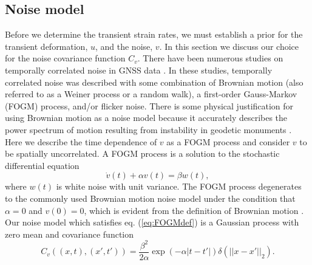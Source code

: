 \documentclass[10pt,a4paper]{article}
\begin{document}
\subsection{Noise model}\label{sec:NoiseModel}
Before we determine the transient strain rates, we must establish a prior for the transient deformation, $u$, and the noise, $v$. In this section we discuss our choice for the noise covariance function $C_v$. There have been numerous studies on temporally correlated noise in GNSS data \citep[e.g.,][]{Zhang1997,Mao1999,Williams2004,Langbein2008}. In these studies, temporally correlated noise was described with some combination of Brownian motion (also referred to as a Weiner process or a random walk), a first-order Gauss-Markov (FOGM) process, and/or flicker noise. There is some physical justification for using Brownian motion as a noise model because it accurately describes the power spectrum of motion resulting from instability in geodetic monuments \citep[e.g.,][]{Wyatt1982,Wyatt1989,Langbein1997}. Here we describe the time dependence of $v$ as a FOGM process and consider $v$ to be spatially uncorrelated. A FOGM process is a solution to the stochastic differential equation
\begin{equation}\label{eq:FOGMdef}
\dot{v}(t) + \alpha v(t) = \beta w(t),
\end{equation}
where $w(t)$ is white noise with unit variance. The FOGM process degenerates to the commonly used Brownian motion noise model under the condition that $\alpha=0$ and $v(0) = 0$, which is evident from the definition of Brownian motion \citep[e.g.,][]{Papoulis1991}. Our noise model which satisfies eq. (\ref{eq:FOGMdef}) is a Gaussian process with zero mean and covariance function
\begin{equation}\label{eq:FOGM}
C_v\left((x,t),(x',t')\right) = \frac{\beta^2}{2\alpha}\exp\left(-\alpha|t - t'|\right) \delta(||x - x'||_2). 
\end{equation}
\end{document}
